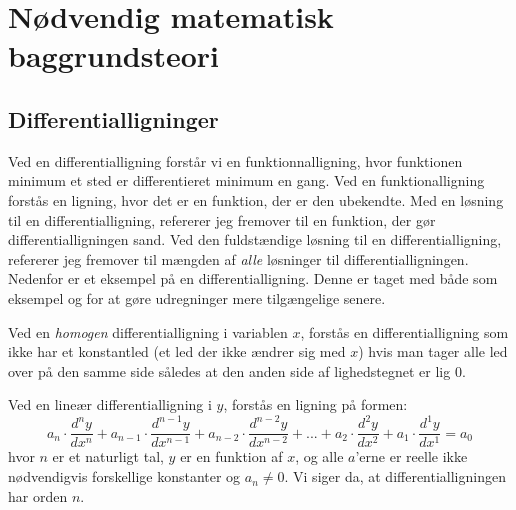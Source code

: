 \section{Nødvendig matematisk baggrundsteori}
\subsection{Differentialligninger}
\newcommand{\LosEks}{$ \{ c\cdot e^{kx}|c\in \mR \} $}%
Ved en differentialligning forstår vi en funktionnalligning, hvor funktionen minimum et sted er differentieret minimum en gang.
Ved en funktionalligning forstås en ligning, hvor det er en funktion, der er den ubekendte. 
Med en løsning til en differentialligning, refererer jeg fremover til en funktion, der gør differentialligningen sand. 
Ved den fuldstændige løsning til en differentialligning, refererer jeg fremover til mængden af \emph{alle} løsninger til differentialligningen. 
Nedenfor er et eksempel på en differentialligning. 
Denne er taget med både som eksempel og for at gøre udregninger mere tilgængelige senere.

\begin{definition}
Ved en \textit{homogen} differentialligning i variablen $x$, forstås en differentialligning som ikke har et konstantled (et led der ikke ændrer sig med $x$) hvis man tager alle led over på den samme side således at den anden side af lighedstegnet er lig $0$.
\end{definition}

\newcommand{\LDiff}[1]{a_{#1} \cdot \frac{d^{#1}y}{d x^{#1}}}
\begin{definition}
Ved en lineær differentialligning i $y$, forstås en ligning på formen:
$$\LDiff{n} + \LDiff{n-1} + \LDiff{n-2}+...+\LDiff{2}+\LDiff{1}=a_0$$
hvor $n$ er et naturligt tal, $y$ er en funktion af $x$, og alle $a$'erne er reelle ikke nødvendigvis forskellige konstanter og $a_n \neq 0$.
Vi siger da, at differentialligningen har orden $n$.

\end{definition}



